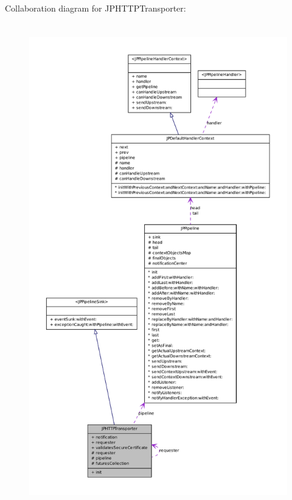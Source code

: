Collaboration diagram for JPHTTPTransporter:\nopagebreak
\begin{figure}[H]
\begin{center}
\leavevmode
\includegraphics[height=600pt]{a00104}
\end{center}
\end{figure}
